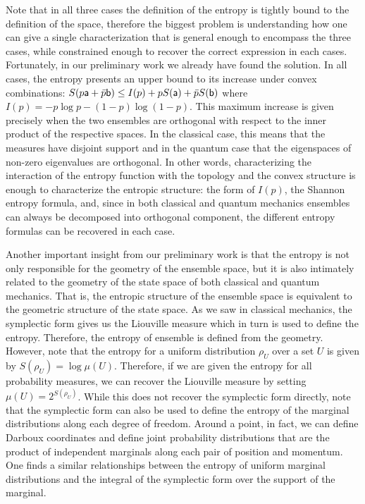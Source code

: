 Note that in all three cases the definition of the entropy is tightly bound to the definition of the space, therefore the biggest problem is understanding how one can give a single characterization that is general enough to encompass the three cases, while constrained enough to recover the correct expression in each cases. Fortunately, in our preliminary work we already have found the solution. In all cases, the entropy presents an upper bound to its increase under convex combinations: $S(p\ens[a] + \bar{p} \ens[b]) \leq I(p) + p S(\ens[a]) + \bar{p} S(\ens[b])$ where $I(p) = -p \log p - (1-p) \log (1-p)$. This maximum increase is given precisely when the two ensembles are orthogonal with respect to the inner product of the respective spaces. In the classical case, this means that the measures have disjoint support and in the quantum case that the eigenspaces of non-zero eigenvalues are orthogonal. In other words, characterizing the interaction of the entropy function with the topology and the convex structure is enough to characterize the entropic structure: the form of $I(p)$, the Shannon entropy formula, and, since in both classical and quantum mechanics ensembles can always be decomposed into orthogonal component, the different entropy formulas can be recovered in each case.

Another important insight from our preliminary work is that the entropy is not only responsible for the geometry of the ensemble space, but it is also intimately related to the geometry of the state space of both classical and quantum mechanics. That is, the entropic structure of the ensemble space is equivalent to the geometric structure of the state space. As we saw in classical mechanics, the symplectic form gives us the Liouville measure which in turn is used to define the entropy. Therefore, the entropy of ensemble is defined from the geometry. However, note that the entropy for a uniform distribution $\rho_U$ over a set $U$ is given by $S(\rho_U) = \log \mu(U)$. Therefore, if we are given the entropy for all probability measures, we can recover the Liouville measure by setting $\mu(U) = 2^{S(\rho_U)}$. While this does not recover the symplectic form directly, note that the symplectic form can also be used to define the entropy of the marginal distributions along each degree of freedom. Around a point, in fact, we can define Darboux coordinates and define joint probability distributions that are the product of independent marginals along each pair of position and momentum. One finds a similar relationships between the entropy of uniform marginal distributions and the integral of the symplectic form over the support of the marginal.


